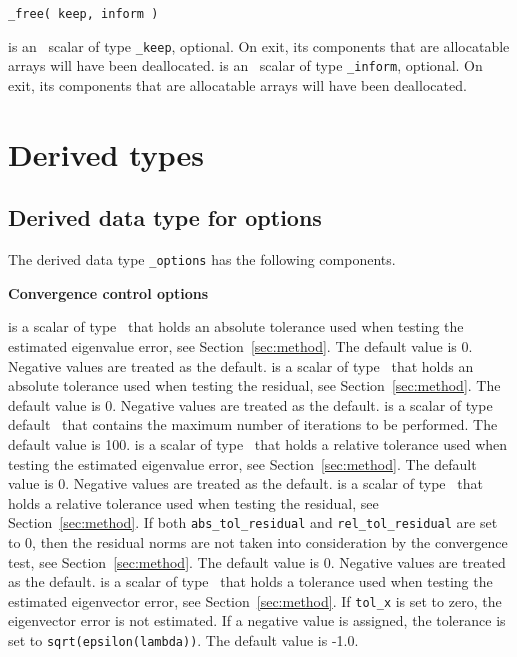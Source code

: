 \medskip

\hspace{8mm} {\tt \solver\_free( keep, inform )}

\begin{description}
%
 is an \intentinout\ scalar of type 
{\tt \solver\_keep}, optional. 
On exit, its components that are allocatable arrays will have been deallocated. 
%
 is an \intentinout\ scalar of type {\tt \solver\_inform}, 
optional.
On exit, its components that are allocatable arrays will have been deallocated. 
%
\end{description}

\section{Derived types}

\subsection{Derived data type for options}

\label{sec:options}

The derived data type
{\tt \solver\_options}
has the following components.

\bigskip
\noindent
{\bf Convergence control options}

\begin{description}
%
 is a scalar of type %
\REALDP\ that
holds an absolute tolerance used when testing the estimated eigenvalue 
error, see Section~\ref{sec:method}. 
The default value is 0. %
Negative values are treated as the default.
%
 is a scalar of type \REALDP\ that
holds an absolute tolerance used when testing the residual, 
see Section~\ref{sec:method}.
The default value is 0.
Negative values are treated as the default.
%
 is a scalar of type default \Integer\ that
contains the maximum number of iterations to be performed.
The default value is 100. %
%
 is a scalar of type \REALDP\ that
holds a relative tolerance used when testing the estimated eigenvalue 
error, see Section~\ref{sec:method}. 
The default value is 0. 
Negative values are treated as the default.
%
 is a scalar of type \REALDP\ that
holds a relative tolerance used when testing the residual,
see Section~\ref{sec:method}. 
If both {\tt abs\_tol\_residual} and {\tt rel\_tol\_residual}
are set to 0, then the residual norms are not taken
into consideration by the convergence test,
see Section~\ref{sec:method}.
The default value is 0.
Negative values are treated as the default.
%
 is a scalar of type \REALDP\ 
that holds a tolerance used when testing the estimated 
eigenvector error, see Section~\ref{sec:method}. 
If {\tt tol\_x} is set to zero, the eigenvector error is not estimated.
If a negative value is assigned, the tolerance is set to
{\tt sqrt(epsilon(lambda))}.
The default value is -1.0.
%
\end{description}

